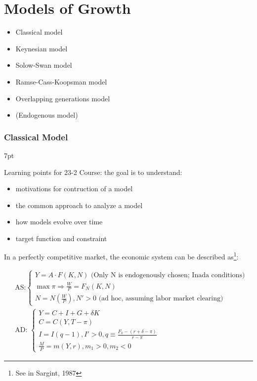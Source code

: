 \documentclass{article}
\providecommand{\tightlist}{
  \setlength{\itemsep}{0pt}
  \setlength{\parskip}{0pt}}
\newenvironment{greenblock}{%
\def\FrameCommand{%
  \hspace{1pt}%
    {\color{Green}%
    \vrule width 2pt}%
    {\color{greenshade}%
    \vrule width 4pt}%
  \colorbox{greenshade}%
}%
\MakeFramed{%
  \advance%
  \hsize-%
  \width%
  \FrameRestore}%
\noindent\hspace{-4.55pt}%
\begin{adjustwidth}{}{7pt}%
\vspace{2pt}\vspace{2pt}%
}
{%
\vspace{2pt}\end{adjustwidth}\endMakeFramed%
}
\begin{document}
\newpage
\part{Models of Growth}

\begin{itemize}
\tightlist
  \item Classical model
  \item Keynesian model
  \item Solow-Swan model
  \item Ramse-Cass-Koopsman model
  \item Overlapping generations model
  \item (Endogenous model)
\end{itemize}


\newpage
\section{Classical Model}\label{classical-model}


\begin{greenblock}
Learning points for 23-2 Course: the goal is to understand:

\begin{itemize}
\tightlist
  \item motivations for contruction of a model
  \item the common approach to analyze a model
  \item how models evolve over time
  \item target function and constraint
\end{itemize}

\end{greenblock}

In a perfectly competitive market, the economic system can be described as\footnote{See in Sargint, 1987}: 

\begin{align}
&\text{AS:}
\begin{cases}
Y=A\cdot F(K,N)\text{ (Only N is endogenously chosen; Inada conditions)}
\\
\max \pi \Rightarrow \frac{W}{P}=F_{N}(K,N) \\
N=N(\frac{W}{P}),N'>0\text{ (ad hoc, assuming labor market clearing)}\end{cases}
\\
&\text{AD: }
\begin{cases}
Y=C+I+G+\delta K \\
C=C(Y,T-\pi) \\
I=I(q-1), I'>0, q\equiv \frac{F_{k}-(r+\delta-\pi)}{r-\pi} \\
\frac{M}{P}=m(Y,r),m_{1}>0,m_{2}<0
\end{cases}
\end{align}
\end{document}
